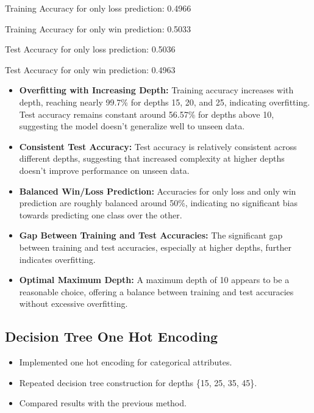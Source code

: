 \documentclass[12pt]{article}
\begin{document}
Training Accuracy for only loss prediction: 0.4966

Training Accuracy for only win prediction: 0.5033

Test Accuracy for only loss prediction: 0.5036

Test Accuracy for only win prediction: 0.4963

\begin{itemize}
    \item \textbf{Overfitting with Increasing Depth:} Training accuracy increases with depth, reaching nearly 99.7\% for depths 15, 20, and 25, indicating overfitting. Test accuracy remains constant around 56.57\% for depths above 10, suggesting the model doesn't generalize well to unseen data.
    
    \item \textbf{Consistent Test Accuracy:} Test accuracy is relatively consistent across different depths, suggesting that increased complexity at higher depths doesn't improve performance on unseen data.
    
    \item \textbf{Balanced Win/Loss Prediction:} Accuracies for only loss and only win prediction are roughly balanced around 50\%, indicating no significant bias towards predicting one class over the other.
    
    \item \textbf{Gap Between Training and Test Accuracies:} The significant gap between training and test accuracies, especially at higher depths, further indicates overfitting.
    
    \item \textbf{Optimal Maximum Depth:} A maximum depth of 10 appears to be a reasonable choice, offering a balance between training and test accuracies without excessive overfitting.
\end{itemize}


\subsection{Decision Tree One Hot Encoding}
    \begin{itemize}
        \item Implemented one hot encoding for categorical attributes.
        \item Repeated decision tree construction for depths \{15, 25, 35, 45\}.
        \item Compared results with the previous method.
    \end{itemize}
\end{document}
